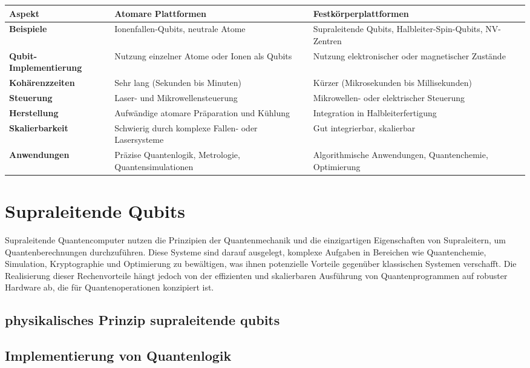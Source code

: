\begin{tabular}{ |p{4cm}|p{5cm}|p{5cm}|  }
 \hline
 \textbf{Aspekt}& \textbf{Atomare Plattformen} & \textbf{Festkörperplattformen}\\
 \hline
 \textbf{Beispiele}   & Ionenfallen-Qubits, neutrale Atome    &Supraleitende Qubits, Halbleiter-Spin-Qubits, NV-Zentren\\
 \textbf{Qubit-Implementierung}&   Nutzung einzelner Atome oder Ionen als Qubits	  & Nutzung elektronischer oder magnetischer Zustände
\\
 \textbf{Kohärenzzeiten} &Sehr lang (Sekunden bis Minuten)	 & Kürzer (Mikrosekunden bis Millisekunden)
\\
 \textbf{Steuerung}    &Laser- und Mikrowellensteuerung	 & Mikrowellen- oder elektrischer Steuerung
\\
 \textbf{Herstellung}&   Aufwändige atomare Präparation und Kühlung	  & Integration in Halbleiterfertigung
\\
 \textbf{Skalierbarkeit}& Schwierig durch komplexe Fallen- oder Lasersysteme	  & Gut integrierbar, skalierbar
   \\
 \textbf{Anwendungen}& Präzise Quantenlogik, Metrologie, Quantensimulationen	  & Algorithmische Anwendungen, Quantenchemie, Optimierung
\\
 \hline
\end{tabular}

\section{Supraleitende Qubits}
Supraleitende Quantencomputer nutzen die Prinzipien der Quantenmechanik und die einzigartigen Eigenschaften von Supraleitern, um Quantenberechnungen durchzuführen. Diese Systeme sind darauf ausgelegt, komplexe Aufgaben in Bereichen wie Quantenchemie, Simulation, Kryptographie und Optimierung zu bewältigen, was ihnen potenzielle Vorteile gegenüber klassischen Systemen verschafft. Die Realisierung dieser Rechenvorteile hängt jedoch von der effizienten und skalierbaren Ausführung von Quantenprogrammen auf robuster Hardware ab, die für Quantenoperationen konzipiert ist.
\subsection{physikalisches Prinzip supraleitende qubits}
\subsection{Implementierung von Quantenlogik}
